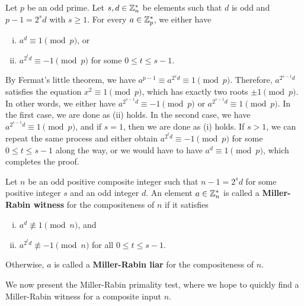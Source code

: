 \begin{thm}
Let $p$ be an odd prime. Let $s, d \in \mathbb{Z}_n^*$ be elements such that $d$ is odd and 
$p - 1 = 2^s d$ with $s \geq 1$. For every $a \in \mathbb{Z}_p^*$, we either have 
\begin{enumerate}[(i)]
    \item $a^d \equiv 1 \pmod p$, or 
    \item $a^{2^td} \equiv -1 \pmod p$ for some $0 \leq t \leq s-1$. 
\end{enumerate}
\end{thm}
\begin{pf}
By Fermat's little theorem, we have $a^{p-1} \equiv a^{2^sd} \equiv 1 \pmod p$. Therefore, 
$a^{2^{s-1}d}$ satisfies the equation $x^2 \equiv 1 \pmod p$, which has exactly two roots 
$\pm1 \pmod p$. In other words, we either have $a^{2^{s-1}d} \equiv -1 \pmod p$ or 
$a^{2^{s-1}d} \equiv 1 \pmod p$. In the first case, we are done as (ii) holds. 
In the second case, we have $a^{2^{s-1}d} \equiv 1 \pmod p$, and if $s = 1$, then we are done as 
(i) holds. If $s > 1$, we can repeat the same process and either obtain $a^{2^td} \equiv -1 \pmod p$
for some $0 \leq t \leq s-1$ along the way, or we would have to have $a^d \equiv 1 \pmod p$, 
which completes the proof. 
\end{pf}

\begin{defn}
Let $n$ be an odd positive composite integer such that $n-1=2^sd$ for some positive integer $s$ and an odd integer $d$. An element $a\in \mathbb{Z}_n^*$ is called a {\bf Miller-Rabin witness} for the compositeness of $n$ if it satisfies
\begin{enumerate}[(i)]
    \item $a^d \not\equiv 1 \pmod n$, and 
    \item $a^{2^td} \not\equiv -1 \pmod n$ for all $0 \leq t \leq s-1$. 
\end{enumerate}
Otherwise, $a$ is called a {\bf Miller-Rabin liar} for the compositeness of $n$. 
\end{defn}

We now present the Miller-Rabin primality test, where we hope to quickly find a Miller-Rabin 
witness for a composite input $n$. 

